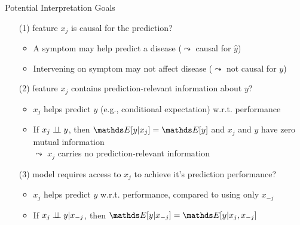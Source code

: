 \documentclass[10pt,compress,t,notes=noshow, xcolor=table]{beamer}
\begin{document}
\begin{frame}{Potential Interpretation Goals}
\begin{enumerate}
   \item[(1)] feature $x_j$ is causal for the prediction?
          \begin{itemize}
          \item A symptom may help predict a disease ($\leadsto$ causal for $\hat{y}$) %
          \item Intervening on symptom may not affect disease ($\leadsto$ not causal for $y$)
      \end{itemize}
    \item[(2)] feature $x_j$ contains prediction-relevant information about $y$?
    \begin{itemize}
      \item $x_j$ helps predict $y$ (e.g., conditional expectation) w.r.t. performance 
      \item If $x_j \perp \!\!\! \perp y$, then $\E[y|x_j] = \E[y]$ and $x_j$ and $y$ have zero mutual information\\ %
      $\leadsto$ $x_j$ carries no prediction-relevant information
    \end{itemize}
    \item[(3)] model requires access to $x_j$ to achieve it's prediction performance?
    \begin{itemize}
      \item $x_{j}$ helps predict $y$ w.r.t. performance, compared to using only $x_{-j}$  %
      \item If $x_j \perp \!\!\! \perp y | x_{-j}$, then $\E[y|x_{-j}] = \E[y|x_j, x_{-j}]$ \\

\end{itemize}
\end{enumerate}
\end{frame}
\end{document}
